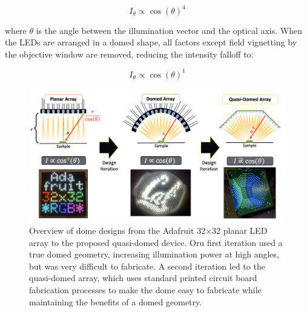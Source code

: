 \begin{equation}
    I_{\theta} \propto {\cos(\theta)}^4
\end{equation}

\noindent where $\theta$ is the angle between the illumination vector and the optical axis. When the LEDs are arranged in a domed shape, all factors except field vignetting by the objective window are removed, reducing the intensity falloff to:

\begin{equation}
I_{\theta} \propto {\cos(\theta)}^1
\end{equation}

\begin{figure} [ht]
\begin{center}
\includegraphics[width=\textwidth]{figures/fig_dome_overview.png}
\end{center}
\caption {Overview of dome designs from the Adafruit 32$\times$32 planar LED array to the proposed quasi-domed device. Oru first iteration used a true domed geometry, increasing illumination power at high angles, but was very difficult to fabricate. A second iteration led to the quasi-domed array, which uses standard printed circuit board fabrication processes to make the dome easy to fabricate while maintaining the benefits of a domed geometry.}
\label{fig:fabrication:dome_overview}
\end{figure}

